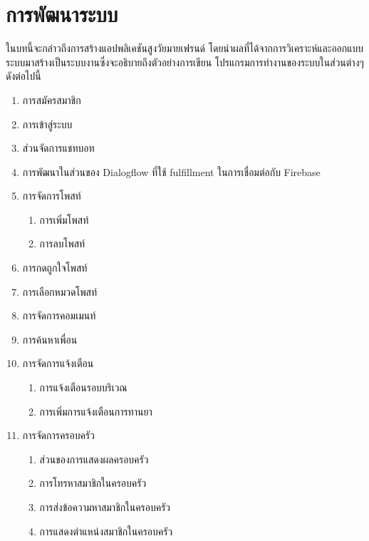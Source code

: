 \chapter{การพัฒนาระบบ}

ในบทนี้จะกล่าวถึงการสร้างแอปพลิเคชันสูงวัยมายเฟรนด์ โดยนำผลที่ได้จากการวิเคราะห์และออกแบบระบบมาสร้างเป็นระบบงานซึ่งจะอธิบายถึงตัวอย่างการเขียน โปรแกรมการทำงานของระบบในส่วนต่างๆดังต่อไปนี้

\begin{enumerate}[label=4.\arabic*]
	\item การสมัครสมาชิก
	\item การเข้าสู่ระบบ
	\item ส่วนจัดการแชทบอท
	\item การพัฒนาในส่วนของ Dialogflow ที่ใช้ fulfillment ในการเชื่อมต่อกับ Firebase
	\item การจัดการโพสท์
	\begin{enumerate}[label=4.5.\arabic*]
		\item การเพิ่มโพสท์
		\item การลบโพสท์
	\end{enumerate}	
	\item การกดถูกใจโพสท์
	\item การเลือกหมวดโพสท์
	\item การจัดการคอมเมนท์
	\item การค้นหาเพื่อน
	\item การจัดการแจ้งเตือน
	\begin{enumerate}[label=4.10.\arabic*]
		\item การแจ้งเตือนรอบบริเวณ
		\item การเพิ่มการแจ้งเตือนการทานยา
	\end{enumerate}	
	\item การจัดการครอบครัว
	\begin{enumerate}[label=4.11.\arabic*]
		\item ส่วนของการแสดงผลครอบครัว
		\item การโทรหาสมาชิกในครอบครัว
		\item การส่งข้อความหาสมาชิกในครอบครัว
		\item การแสดงตำแหน่งสมาชิกในครอบครัว
	\end{enumerate}	
\end{enumerate}	


